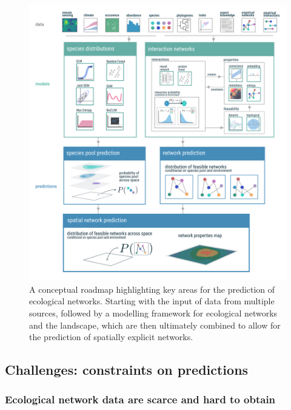 \begin{figure}[h]
    \centering
    \includegraphics[width=\textwidth]{figures/concept_v6.png}
    \caption{A conceptual roadmap highlighting key areas for the prediction
of ecological networks. Starting with the input of data from multiple
sources, followed by a modelling framework for ecological networks and
the landscape, which are then ultimately combined to allow for the
prediction of spatially explicit networks.}
    \label{fig:conceptual}
\end{figure}

\subsection{Challenges: constraints on
predictions}\label{challenges-constraints-on-predictions}

\subsubsection{Ecological network data are scarce and hard to
obtain}\label{ecological-network-data-are-scarce-and-hard-to-obtain}

